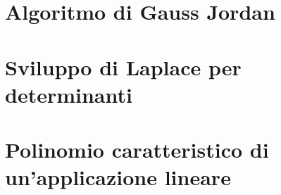 \documentclass{article}
\begin{document}
\section{Algoritmo di Gauss Jordan}
\label{sec:algoritmodigauss}

\section{Sviluppo di Laplace per determinanti}
\label{sec:laplace}

\section{Polinomio caratteristico di un'applicazione lineare}
\label{sec:polinomicaratteristici}
\end{document}
